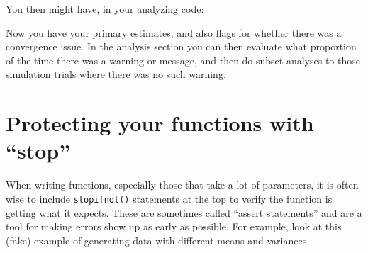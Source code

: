 \documentclass[
]{book}
\newenvironment{Shaded}{\begin{snugshade}}{\end{snugshade}}
\newcommand{\AttributeTok}[1]{\textcolor[rgb]{0.13,0.29,0.53}{#1}}
\newcommand{\CommentTok}[1]{\textcolor[rgb]{0.56,0.35,0.01}{\textit{#1}}}
\newcommand{\ControlFlowTok}[1]{\textcolor[rgb]{0.13,0.29,0.53}{\textbf{#1}}}
\newcommand{\DecValTok}[1]{\textcolor[rgb]{0.00,0.00,0.81}{#1}}
\newcommand{\FunctionTok}[1]{\textcolor[rgb]{0.13,0.29,0.53}{\textbf{#1}}}
\newcommand{\NormalTok}[1]{#1}
\newcommand{\OtherTok}[1]{\textcolor[rgb]{0.56,0.35,0.01}{#1}}
\newcommand{\SpecialCharTok}[1]{\textcolor[rgb]{0.81,0.36,0.00}{\textbf{#1}}}
\newcommand{\StringTok}[1]{\textcolor[rgb]{0.31,0.60,0.02}{#1}}
\begin{document}
You then might have, in your analyzing code:

\begin{Shaded}
\end{Shaded}

Now you have your primary estimates, and also flags for whether there was a convergence issue.
In the analysis section you can then evaluate what proportion of the time there was a warning or message, and then do subset analyses to those simulation trials where there was no such warning.

\section{Protecting your functions with ``stop''}\label{about-stopifnot}

When writing functions, especially those that take a lot of parameters, it is often wise to include \texttt{stopifnot()} statements at the top to verify the function is getting what it expects.
These are sometimes called ``assert statements'' and are a tool for making errors show up as early as possible.
For example, look at this (fake) example of generating data with different means and variances
\end{document}
